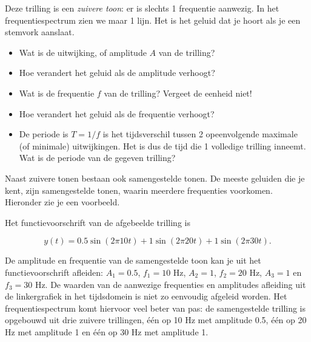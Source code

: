 Deze trilling is een \emph{zuivere toon}: er is slechts 1 frequentie aanwezig. In het frequentiespectrum zien we maar 1 lijn. Het is het geluid dat je hoort als je een stemvork aanslaat.

\begin{oef}
\begin{itemize}
	\item Wat is de uitwijking, of amplitude $A$ van de trilling? 
	\item Hoe verandert het geluid als de amplitude verhoogt?
	\item Wat is de frequentie $f$ van de trilling? Vergeet de eenheid niet!
	\item Hoe verandert het geluid als de frequentie verhoogt?
	\item De periode is $T=1/f$ is het tijdsverschil tussen 2 opeenvolgende maximale (of minimale) uitwijkingen. Het is dus de tijd die 1 volledige trilling inneemt. Wat is de periode van de gegeven trilling?
\end{itemize}
\end{oef}

Naast zuivere tonen bestaan ook samengestelde tonen. De meeste geluiden die je kent, zijn samengestelde tonen, waarin meerdere frequenties voorkomen. Hieronder zie je een voorbeeld.


Het functievoorschrift van de afgebeelde trilling is 

\begin{equation*}
y(t) = 0.5 \sin(2 \pi 10 t) + 1 \sin(2 \pi 20 t) + 1 \sin(2 \pi 30 t).
\end{equation*}

De amplitude en frequentie van de samengestelde toon kan je uit het functievoorschrift afleiden: $A_1 = 0.5$, $f_1 = 10$ Hz, $A_2 = 1$, $f_2 = 20$ Hz, $A_3 = 1$ en $f_3 = 30$ Hz. De waarden van de aanwezige frequenties en amplitudes afleiding uit de linkergrafiek in het tijdsdomein is niet zo eenvoudig afgeleid worden. Het frequentiespectrum komt hiervoor veel beter van pas: de samengestelde trilling is opgebouwd uit drie zuivere trillingen, \'e\'en op 10 Hz met amplitude 0.5, \'e\'en op 20 Hz met amplitude 1 en \'e\'en op 30 Hz met amplitude 1.

